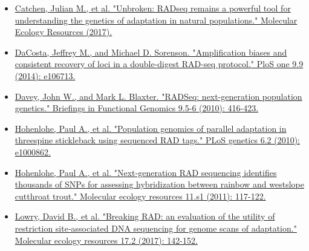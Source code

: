 \documentclass[11pt]{article}
\begin{document}
\begin{itemize}
\item \href{http://onlinelibrary.wiley.com/doi/10.1111/1755-0998.12669/abstract}{Catchen, Julian M., et al. "Unbroken: RADseq remains a powerful tool for understanding the genetics of adaptation in natural populations." Molecular Ecology Resources (2017).}
\end{itemize}


\begin{itemize}
\item \href{http://journals.plos.org/plosone/article?id=10.1371/journal.pone.0106713}{DaCosta, Jeffrey M., and Michael D. Sorenson. "Amplification biases and consistent recovery of loci in a double-digest RAD-seq protocol." PloS one 9.9 (2014): e106713.}
\end{itemize}


\begin{itemize}
\item \href{http://bfg.oxfordjournals.org/content/9/5-6/416.short}{Davey, John W., and Mark L. Blaxter. "RADSeq: next-generation population genetics." Briefings in Functional Genomics 9.5-6 (2010): 416-423.}
\end{itemize}


\begin{itemize}
\item \href{http://journals.plos.org/plosgenetics/article?id=10.1371/journal.pgen.1000862}{Hohenlohe, Paul A., et al. "Population genomics of parallel adaptation in threespine stickleback using sequenced RAD tags." PLoS genetics 6.2 (2010): e1000862.}
\end{itemize}


\begin{itemize}
\item \href{http://onlinelibrary.wiley.com/doi/10.1111/j.1755-0998.2010.02967.x/abstract?deniedAccessCustomisedMessage=&userIsAuthenticated=false}{Hohenlohe, Paul A., et al. "Next‐generation RAD sequencing identifies thousands of SNPs for assessing hybridization between rainbow and westslope cutthroat trout." Molecular ecology resources 11.s1 (2011): 117-122.}
\end{itemize}


\begin{itemize}
\item \href{http://onlinelibrary.wiley.com/doi/10.1111/1755-0998.12635/abstract}{Lowry, David B., et al. "Breaking RAD: an evaluation of the utility of restriction site‐associated DNA sequencing for genome scans of adaptation." Molecular ecology resources 17.2 (2017): 142-152.}
\end{itemize}
\end{document}
